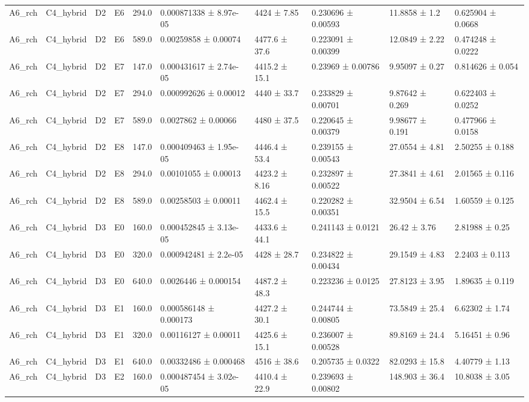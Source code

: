\begin{table}
\begin{tabular}{llllllllll}
A6\_rch & C4\_hybrid & D2 & E6 & 294.0 & 0.000871338 ± 8.97e-05 & 4424 ± 7.85 & 0.230696 ± 0.00593 & 11.8858 ± 1.2 & 0.625904 ± 0.0668 \\
A6\_rch & C4\_hybrid & D2 & E6 & 589.0 & 0.00259858 ± 0.00074 & 4477.6 ± 37.6 & 0.223091 ± 0.00399 & 12.0849 ± 2.22 & 0.474248 ± 0.0222 \\
A6\_rch & C4\_hybrid & D2 & E7 & 147.0 & 0.000431617 ± 2.74e-05 & 4415.2 ± 15.1 & 0.23969 ± 0.00786 & 9.95097 ± 0.27 & 0.814626 ± 0.054 \\
A6\_rch & C4\_hybrid & D2 & E7 & 294.0 & 0.000992626 ± 0.00012 & 4440 ± 33.7 & 0.233829 ± 0.00701 & 9.87642 ± 0.269 & 0.622403 ± 0.0252 \\
A6\_rch & C4\_hybrid & D2 & E7 & 589.0 & 0.0027862 ± 0.00066 & 4480 ± 37.5 & 0.220645 ± 0.00379 & 9.98677 ± 0.191 & 0.477966 ± 0.0158 \\
A6\_rch & C4\_hybrid & D2 & E8 & 147.0 & 0.000409463 ± 1.95e-05 & 4446.4 ± 53.4 & 0.239155 ± 0.00543 & 27.0554 ± 4.81 & 2.50255 ± 0.188 \\
A6\_rch & C4\_hybrid & D2 & E8 & 294.0 & 0.00101055 ± 0.00013 & 4423.2 ± 8.16 & 0.232897 ± 0.00522 & 27.3841 ± 4.61 & 2.01565 ± 0.116 \\
A6\_rch & C4\_hybrid & D2 & E8 & 589.0 & 0.00258503 ± 0.00011 & 4462.4 ± 15.5 & 0.220282 ± 0.00351 & 32.9504 ± 6.54 & 1.60559 ± 0.125 \\
A6\_rch & C4\_hybrid & D3 & E0 & 160.0 & 0.000452845 ± 3.13e-05 & 4433.6 ± 44.1 & 0.241143 ± 0.0121 & 26.42 ± 3.76 & 2.81988 ± 0.25 \\
A6\_rch & C4\_hybrid & D3 & E0 & 320.0 & 0.000942481 ± 2.2e-05 & 4428 ± 28.7 & 0.234822 ± 0.00434 & 29.1549 ± 4.83 & 2.2403 ± 0.113 \\
A6\_rch & C4\_hybrid & D3 & E0 & 640.0 & 0.0026446 ± 0.000154 & 4487.2 ± 48.3 & 0.223236 ± 0.0125 & 27.8123 ± 3.95 & 1.89635 ± 0.119 \\
A6\_rch & C4\_hybrid & D3 & E1 & 160.0 & 0.000586148 ± 0.000173 & 4427.2 ± 30.1 & 0.244744 ± 0.00805 & 73.5849 ± 25.4 & 6.62302 ± 1.74 \\
A6\_rch & C4\_hybrid & D3 & E1 & 320.0 & 0.00116127 ± 0.00011 & 4425.6 ± 15.1 & 0.236007 ± 0.00528 & 89.8169 ± 24.4 & 5.16451 ± 0.96 \\
A6\_rch & C4\_hybrid & D3 & E1 & 640.0 & 0.00332486 ± 0.000468 & 4516 ± 38.6 & 0.205735 ± 0.0322 & 82.0293 ± 15.8 & 4.40779 ± 1.13 \\
A6\_rch & C4\_hybrid & D3 & E2 & 160.0 & 0.000487454 ± 3.02e-05 & 4410.4 ± 22.9 & 0.239693 ± 0.00802 & 148.903 ± 36.4 & 10.8038 ± 3.05 \\

\end{tabular}
\end{table}
